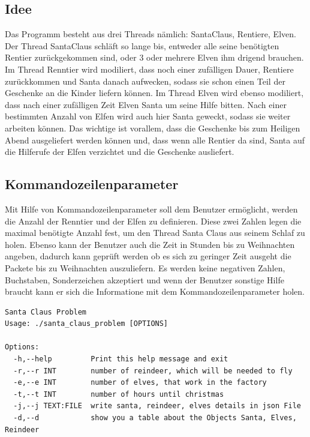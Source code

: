 \documentclass[a4paper,12pt]{article}
\begin{document}
\subsection{Idee}
Das Programm besteht aus drei Threads nämlich: SantaClaus, Rentiere, Elven. Der Thread SantaClaus schläft so lange bis, entweder alle seine benötigten Rentier zurückgekommen sind, oder 3 oder mehrere Elven ihm drigend brauchen.
Im Thread Renntier wird modiliert, dass noch einer zufälligen Dauer, Rentiere zurückkommen und Santa danach aufwecken, sodass sie schon einen Teil der Geschenke an die Kinder liefern können. Im Thread Elven wird ebenso modiliert, dass
nach einer zufälligen Zeit Elven Santa um seine Hilfe bitten. Nach einer bestimmten Anzahl von Elfen wird auch hier Santa geweckt, sodass sie weiter arbeiten können. Das wichtige ist vorallem, dass die Geschenke bis zum Heiligen Abend
ausgeliefert werden können und, dass wenn alle Rentier da sind, Santa auf die Hilferufe der Elfen verzichtet und die Geschenke ausliefert.

\subsection{Kommandozeilenparameter}
Mit Hilfe von Kommandozeilenparameter soll dem Benutzer ermöglicht, werden die Anzahl der Renntier und der Elfen zu definieren. Diese zwei Zahlen legen die maximal benötigte Anzahl fest, um den Thread Santa Claus aus seinem Schlaf zu holen.
Ebenso kann der Benutzer auch die Zeit in Stunden bis zu Weihnachten angeben, dadurch kann geprüft werden ob es sich zu geringer Zeit ausgeht die Packete bis zu Weihnachten auszuliefern.
Es werden keine negativen Zahlen, Buchstaben, Sonderzeichen akzeptiert und wenn der Benutzer sonstige Hilfe braucht kann er sich die Informatione mit dem Kommandozeilenparameter holen.
\begin{verbatim}
Santa Claus Problem
Usage: ./santa_claus_problem [OPTIONS]

Options:
  -h,--help         Print this help message and exit
  -r,--r INT        number of reindeer, which will be needed to fly
  -e,--e INT        number of elves, that work in the factory
  -t,--t INT        number of hours until christmas
  -j,--j TEXT:FILE  write santa, reindeer, elves details in json File
  -d,--d            show you a table about the Objects Santa, Elves, Reindeer
\end{verbatim}
\end{document}
